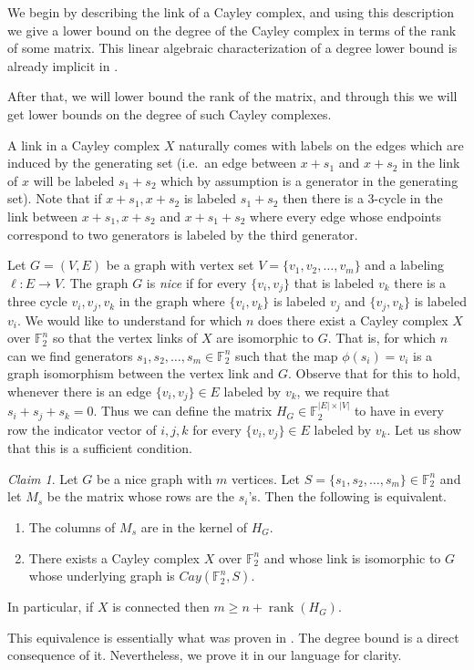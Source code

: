 \documentclass[10pt,a4paper]{article}
\theoremstyle{definition}
\theoremstyle{remark}
\newtheorem{claim}[theorem]{Claim}
\newcommand{\set}[1]{\{#1\}}
\newcommand{\F}{\mathbb{F}}
\DeclareMathOperator{\rank}{rank}
\renewcommand{\geq}{\geqslant}
\numberwithin{equation}{section}
\begin{document}
    We begin by describing the link of a Cayley complex, and using this description we give a lower bound on the degree of the Cayley complex in terms of the rank of some matrix. This linear algebraic characterization of a degree lower bound is already implicit in \cite[Section 6]{Golowich2023}. 
    
    After that, we will lower bound the rank of the matrix, and through this we will get lower bounds on the degree of such Cayley complexes.  
    
    A link in a Cayley complex \(X\) naturally comes with labels on the edges which are induced by the generating set (i.e.\ an edge between \(x+s_1\) and \(x+s_2\) in the link of \(x\) will be labeled \(s_1+s_2\) which by assumption is a generator in the generating set). Note that if \(x+s_1,x+s_2\) is labeled \(s_1+s_2\) then there is a \(3\)-cycle in the link between \(x+s_1,x+s_2\) and \(x+s_1+s_2\) where every edge whose endpoints correspond to two generators is labeled by the third generator.

    Let \(G=(V,E)\) be a graph with vertex set \(V=\set{v_1,v_2,\dots,v_m}\) and a labeling \(\ell:E \to V\). The graph \(G\) is \emph{nice} if for every \(\set{v_i,v_j}\) that is labeled \(v_k\) there is a three cycle \(v_i,v_j,v_k\) in the graph where \(\set{v_i,v_k}\) is labeled \(v_j\) and \(\set{v_j,v_k}\) is labeled \(v_i\). We would like to understand for which \(n\) does there exist a Cayley complex \(X\) over $\F_2^n$ so that the vertex links of \(X\) are isomorphic to \(G\). That is, for which \(n\) can we find generators \(s_1,s_2,\dots,s_m \in \F_2^n\) such that the map \(\phi(s_i)=v_i\) is a graph isomorphism between the vertex link and $G$. Observe that for this to hold, whenever there is an edge \(\set{v_i,v_j} \in E\) labeled by \(v_k\), we require  that \(s_i+s_j+s_k = 0\). Thus we can define the matrix \(H_G \in \F_2^{|E| \times |V|}\) to have in every row the indicator vector of \(i,j,k\) for every \(\set{v_i,v_j} \in E\) labeled by \(v_k\). Let us show that this is a sufficient condition.

\begin{claim} \label{claim:deg-lower-bound}
    Let \(G\) be a nice graph with \(m\) vertices. Let \(S = \set{s_1,s_2,\dots,s_m} \in \F_2^n\) and let \(M_s\) be the matrix whose rows are the \(s_i\)'s. Then the following is equivalent.
    \begin{enumerate}
        \item The columns of \(M_s\) are in the kernel of \(H_G\).
        \item There exists a Cayley complex \(X\) over \(\F_2^n\) and whose link is isomorphic to \(G\) whose underlying graph is \(Cay(\F_2^n,S)\).
    \end{enumerate}
    In particular, if $X$ is connected then 
    \(m \geq n + \rank(H_G)\).
\end{claim}
This equivalence is essentially what was proven in \cite[Lemma 77]{Golowich2023}. The degree bound is a direct consequence of it. Nevertheless, we prove it in our language for clarity.
\end{document}

